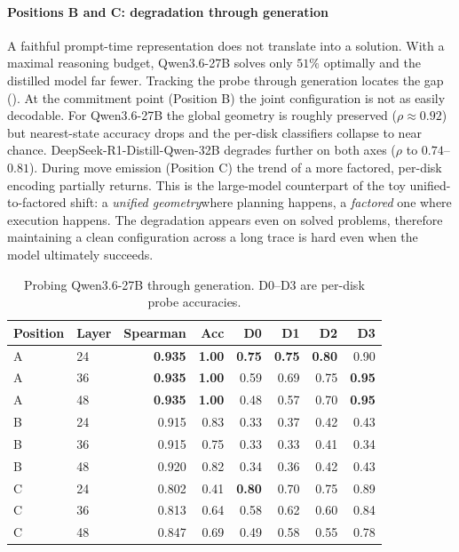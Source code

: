 \documentclass{article} %
\begin{document}
\paragraph{Positions B and C: degradation through generation}
\label{sec:lrm-posBC}

A faithful prompt-time representation does not translate into a solution. With a maximal reasoning budget, Qwen3.6-27B solves only $51\%$ optimally and the distilled model far fewer. Tracking the probe through generation locates the gap (). At the commitment point (Position B) the joint configuration is not as easily decodable. For Qwen3.6-27B the global geometry is roughly preserved ($\rho\approx0.92$) but nearest-state accuracy drops and the per-disk classifiers collapse to near chance. DeepSeek-R1-Distill-Qwen-32B degrades further on both axes ($\rho$ to $0.74$--$0.81$). During move emission (Position C) the trend of a more factored, per-disk encoding partially returns. This is the large-model counterpart of the toy unified-to-factored shift: a \emph{unified geometry}where planning happens, a \emph{factored} one where execution happens. The degradation appears even on solved problems, therefore maintaining a clean configuration across a long trace is hard even when the model ultimately succeeds. %

\begin{table}[t]
  \centering
  \caption{Probing Qwen3.6-27B through generation. D0--D3 are per-disk probe accuracies.}
  \label{tab:posBC}
  \begin{tabular}{llrrrrrr}
    \toprule
    \textbf{Position} & \textbf{Layer} & \textbf{Spearman} & \textbf{Acc} & \textbf{D0} & \textbf{D1} & \textbf{D2} & \textbf{D3} \\
    \midrule
    A & 24 & \textbf{0.935} & \textbf{1.00} & \textbf{0.75} & \textbf{0.75} & \textbf{0.80} & 0.90 \\
    A & 36 & \textbf{0.935} & \textbf{1.00} & 0.59 & 0.69 & 0.75 & \textbf{0.95} \\
    A & 48 & \textbf{0.935} & \textbf{1.00} & 0.48 & 0.57 & 0.70 & \textbf{0.95} \\
    \midrule
    B & 24 & 0.915 & 0.83 & 0.33 & 0.37 & 0.42 & 0.43 \\
    B & 36 & 0.915 & 0.75 & 0.33 & 0.33 & 0.41 & 0.34 \\
    B & 48 & 0.920 & 0.82 & 0.34 & 0.36 & 0.42 & 0.43 \\
    \midrule
    C & 24 & 0.802 & 0.41 & \textbf{0.80} & 0.70 & 0.75 & 0.89 \\
    C & 36 & 0.813 & 0.64 & 0.58 & 0.62 & 0.60 & 0.84 \\
    C & 48 & 0.847 & 0.69 & 0.49 & 0.58 & 0.55 & 0.78 \\
    \bottomrule
  \end{tabular}
\end{table}
\end{document}
